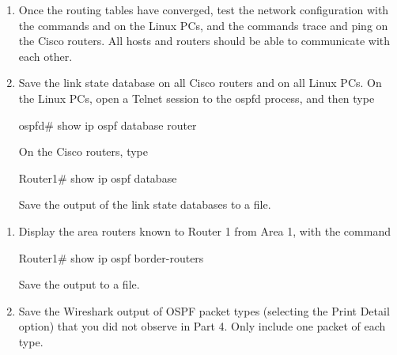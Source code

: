 \begin{enumerate}
	\item Once the routing tables have converged, test the network configuration with the commands  and  on the Linux PCs, and the commands trace and ping on the Cisco routers. All hosts and routers should be able to communicate with each other.
	\item Save the link state database on all Cisco routers and on all Linux PCs. On the Linux PCs, open a Telnet session to the ospfd process, and then type
		\begin{cmdblock}
	ospfd# show ip ospf database router
		\end{cmdblock}
		On the Cisco routers, type
		\begin{cmdblock}
	Router1# show ip ospf database
		\end{cmdblock}
		Save the output of the link state databases to a file.
\end{enumerate}

\begin{questions}
\end{questions}

\begin{enumerate}[resume]
	\item Display the area routers known to Router 1 from Area 1, with the command
		\begin{cmdblock}
	Router1# show ip ospf border-routers
		\end{cmdblock}
		Save the output to a file.
	\item Save the Wireshark output of OSPF packet types (selecting the Print Detail option) that you did not observe in Part 4. Only include one packet of each type.
\end{enumerate}

\begin{questions}
\end{questions}
